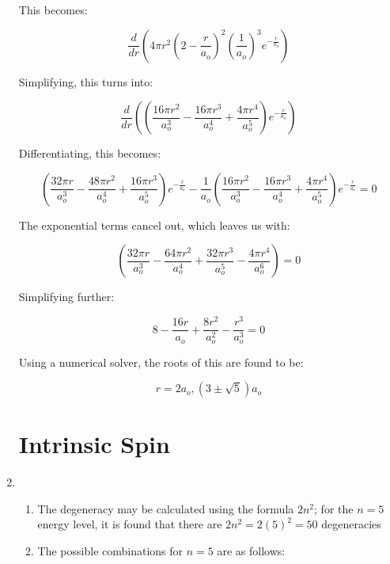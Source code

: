 \begin{enumerate}
  This becomes:

  $$\frac{d}{dr}\left( 4\pi r^2\left( 2-\frac{r}{a_o} \right)^2\left( \frac{1}{a_o} \right)^3  e^{-\frac{r}{a_o}}\right)$$

  Simplifying, this turns into:

  $$\frac{d}{dr}\left( \left( \frac{16\pi r^2}{a_o^3}-\frac{16\pi r^3}{a_o^4}+\frac{4\pi r^4}{a_o^5} \right)e^{-\frac{r}{a_o}} \right)$$

  Differentiating, this becomes:

  $$\left( \frac{32\pi r}{a_o^3}-\frac{48\pi r^2}{a_o^4}+\frac{16\pi r^3}{a_o^5} \right)e^{-\frac{r}{a_o}}-\frac{1}{a_o}\left( \frac{16\pi r^2}{a_o^3}-\frac{16\pi r^3}{a_o^4}+\frac{4\pi r^4}{a_o^5} \right)e^{-\frac{r}{a_o}}=0$$

  The exponential terms cancel out, which leaves us with:

  $$\left( \frac{32\pi r}{a_o^3}-\frac{64\pi r^2}{a_o^4}+\frac{32\pi r^3}{a_o^5}-\frac{4\pi r^4}{a_o^6} \right)=0$$

  Simplifying further:

  $$8-\frac{16r}{a_o}+\frac{8r^2}{a_o^2}-\frac{r^3}{a_o^3}=0$$

  Using a numerical solver, the roots of this are found to be:

  $$r=2a_o,(3\pm\sqrt{5})a_o$$

    \section*{Intrinsic Spin}

  \item

    \begin{enumerate}

      \item The degeneracy may be calculated using the formula $2n^2$; for the $n=5$ energy level, it is found that there are $2n^2=2(5)^2=50$ degeneracies

      \item The possible combinations for $n=5$ are as follows:


\end{enumerate}
\end{enumerate}
